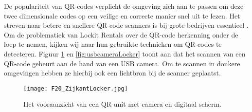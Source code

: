 De populariteit van QR-codes verplicht de omgeving zich aan te passen om deze twee dimensionale codes op een veilige en correcte manier snel uit te lezen. Het streven naar betere en snellere QR-code scanners is bij grote bedrijven essentieel \autocite{Ertekin2015}.
Om de problematiek van Lockit Rentals over de QR-code herkenning onder de loep te nemen, kijken wij naar hun gebruikte technieken om QR-codes te detecteren. Figuur \ref{fig:zijkantLocker} en \ref{fig:usbcameraLocker} toont aan dat het scannen van een QR-code gebeurt aan de hand van een USB camera. Om te scannen in donkere omgevingen hebben ze hierbij ook een lichtbron bij de scanner geplaatst.

\begin{figure}[h]
    \centering
    \texttt{[image: F20\_ZijkantLocker.jpg]}
    \captionsetup{justification=ce/brntering, singlelinecheck=false}    
    \caption{Het vooraanzicht van een QR-unit met camera en digitaal scherm.}
    \label{fig:zijkantLocker}
\end{figure}

